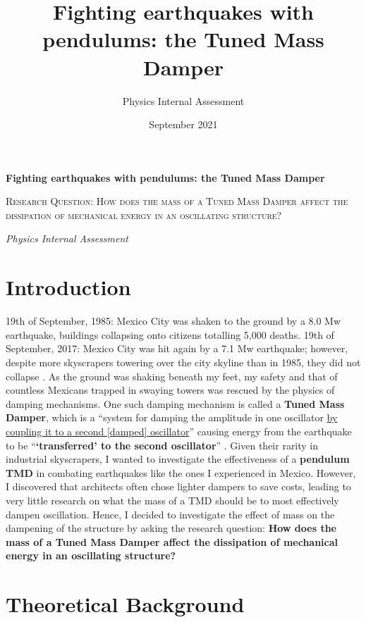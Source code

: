\documentclass[11pt]{article}
\title{Fighting earthquakes with pendulums: the Tuned Mass Damper}
\author{Physics Internal Assessment
}
\date{September 2021}
\begin{document}
\begin{titlepage}
	\centering
	{\huge\bfseries Fighting earthquakes with pendulums: the Tuned Mass Damper \par}
	\vspace{2cm}
	{\scshape\Large Research Question: How does the mass of a Tuned Mass Damper affect the dissipation of mechanical energy in an oscillating structure? \par}
	\vspace{1.5cm}
	{\Large\itshape Physics Internal Assessment \par}

	\vfill

\end{titlepage}


\clearpage
\section{Introduction}

19th of September, 1985: Mexico City was shaken to the ground by a 8.0 Mw earthquake, buildings collapsing onto citizens totalling 5,000 deaths. 19th of September, 2017: Mexico City was hit again by a 7.1 Mw earthquake; however, despite more skyscrapers towering over the city skyline than in 1985, they did not collapse \cite{source2}. As the ground was shaking beneath my feet, my safety and that of countless Mexicans trapped in swaying towers was rescued by the physics of damping mechanisms. One such damping mechanism is called a \textbf{Tuned Mass Damper}, which is a “system for damping the amplitude in one oscillator \underline{by coupling it to a second [damped] oscillator}” causing energy from the earthquake to be “\textbf{‘transferred’ to the second oscillator}” \cite{source1}. Given their rarity in industrial skyscrapers, I wanted to investigate the effectiveness of a \textbf{pendulum TMD} in combating earthquakes like the ones I experienced in Mexico. However, I discovered that architects often chose lighter dampers to save costs, leading to very little research on what the mass of a TMD should be to most effectively dampen oscillation. Hence, I decided to investigate the effect of mass on the dampening of the structure by asking the research question: \textbf{How does the mass of a Tuned Mass Damper affect the dissipation of mechanical energy in an oscillating structure?}

\section{Theoretical Background}
\end{document}
